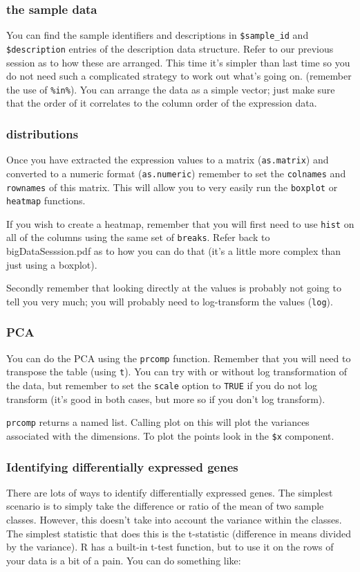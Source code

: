 \documentclass[11pt]{article}
\begin{document}
\subsubsection{the sample data}
You can find the sample identifiers and descriptions in \verb|$sample_id| and
\verb|$description| entries of the description data structure. Refer to our
previous session as to how these are arranged. This time it's simpler than last
time so you do not need such a complicated strategy to work out what's going on.
(remember the use of \verb|%in%|). You can arrange the data as a simple vector;
just make sure that the order of it correlates to the column order of
the expression data.

\subsubsection{distributions}
Once you have extracted the expression values to a matrix (\texttt{as.matrix}) 
and converted to
a numeric format (\texttt{as.numeric}) remember to set the 
\texttt{colnames} and \texttt{rownames} of this matrix. This will allow
you to very easily run the \texttt{boxplot} or \texttt{heatmap} functions.

If you wish to create a heatmap, remember that you will first need to use
\texttt{hist} on all of the columns using the same set of \texttt{breaks}.
Refer back to bigDataSesssion.pdf as to how you can do that (it's a little
more complex than just using a boxplot).

Secondly remember that looking directly at the values is probably not going
to tell you very much; you will probably need to log-transform the values
(\texttt{log}).

\subsubsection{PCA}
You can do the PCA using the \texttt{prcomp} function. Remember that you will
need to transpose the table (using \texttt{t}). You can try with or without
log transformation of the data, but remember to set the \texttt{scale} option
to \texttt{TRUE} if you do not log transform (it's good in both cases, but
more so if you don't log transform).

\texttt{prcomp} returns a named list. Calling plot on this will plot the variances
associated with the dimensions. To plot the points look in the \verb|$x| component.

\subsubsection{Identifying differentially expressed genes}
There are lots of ways to identify differentially expressed genes. The simplest
scenario is to simply take the difference or ratio of the mean of two
sample classes. However, this doesn't take into account the variance within
the classes. The simplest statistic that does this is the t-statistic (difference
in means divided by the variance). R has a built-in t-test function, but to
use it on the rows of your data is a bit of a pain. You can do something like:
\end{document}
